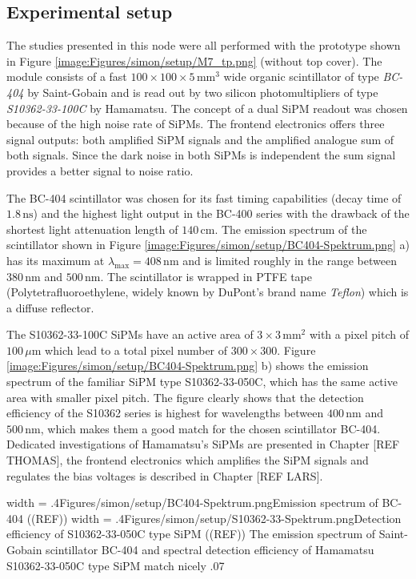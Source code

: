 \subsection{Experimental setup}
\label{section:simon/setup}
The studies presented in this node were all performed with the prototype shown in Figure \ref{image:Figures/simon/setup/M7_tp.png} (without top cover). The module consists of a fast $100 \times 100 \times 5 \,\text{mm}^3$ wide organic scintillator of type \emph{BC-404} by Saint-Gobain and is read out by two silicon photomultipliers of type \emph{S10362-33-100C} by Hamamatsu. The concept of a dual SiPM readout was chosen because of the high noise rate of SiPMs. The frontend electronics offers three signal outputs: both amplified SiPM signals and the amplified analogue sum of both signals. Since the dark noise in both SiPMs is independent the sum signal provides a better signal to noise ratio.

The BC-404 scintillator was chosen for its fast timing capabilities (decay time of $1.8\,\text{ns}$) and the highest light output in the BC-400 series with the drawback of the shortest light attenuation length of $140\,\text{cm}$. The emission spectrum of the scintillator shown in Figure \ref{image:Figures/simon/setup/BC404-Spektrum.png} a) has its maximum at $\lambda_\text{max} = 408\,\text{nm}$ and is limited roughly in the range between $380\,\text{nm}$ and $500\,\text{nm}$. The scintillator is wrapped in PTFE tape (Polytetrafluoroethylene, widely known by DuPont's brand name \emph{Teflon}) which is a diffuse reflector.

The S10362-33-100C SiPMs have an active area of $3 \times 3\,\text{mm}^2$ with a pixel pitch of $100\,\mu\text{m}$ which lead to a total pixel number of $300 \times 300$. Figure \ref{image:Figures/simon/setup/BC404-Spektrum.png} b) shows the emission spectrum of the familiar SiPM type S10362-33-050C, which has the same active area with smaller pixel pitch. The figure clearly shows that the detection efficiency of the S10362 series is highest for wavelengths between $400\,\text{nm}$ and $500\,\text{nm}$, which makes them a good match for the chosen scintillator BC-404. Dedicated investigations of Hamamatsu's SiPMs are presented in Chapter [REF THOMAS], the frontend electronics which amplifies the SiPM signals and regulates the bias voltages is described in Chapter [REF LARS].

\doubleimage
{width = .4\textwidth}{Figures/simon/setup/BC404-Spektrum.png}{Emission spectrum of BC-404 ((REF))}
{width = .4\textwidth}{Figures/simon/setup/S10362-33-Spektrum.png}{Detection efficiency of S10362-33-050C type SiPM ((REF))}
{The emission spectrum of Saint-Gobain scintillator BC-404 and spectral detection efficiency of Hamamatsu S10362-33-050C type SiPM match nicely}
{.07\textwidth}

